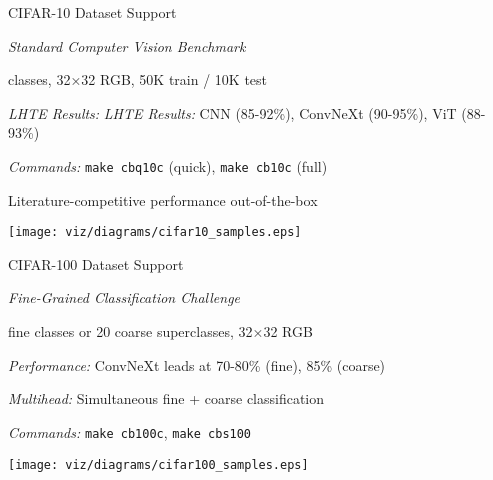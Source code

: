 \begin{slide}[\slideopts,toc={CIFAR-10}]{CIFAR-10 Dataset Support}
  
  \emph{Standard Computer Vision Benchmark}
  
  \begin{itemize}
     classes, 32×32 RGB, 50K train / 10K test
    
    \mpitem \emph{LHTE Results:}
    \mpitem \emph{LHTE Results:} CNN (85-92\%), ConvNeXt (90-95\%), ViT (88-93\%)
    
    \mpitem \emph{Commands:} \texttt{make cbq10c} (quick), \texttt{make cb10c} (full)
    
    \mpitem Literature-competitive performance out-of-the-box
  \end{itemize}
  
  \vspace{0.5em}
  \centerline{\texttt{[image: viz/diagrams/cifar10\_samples.eps]}}
\end{slide}

\begin{slide}[\slideopts,toc={CIFAR-100}]{CIFAR-100 Dataset Support}
  
  \emph{Fine-Grained Classification Challenge}
  
  \begin{itemize}
     fine classes or 20 coarse superclasses, 32×32 RGB
    
    \mpitem \emph{Performance:} ConvNeXt leads at 70-80\% (fine), 85\% (coarse)
    
    \mpitem \emph{Multihead:} Simultaneous fine + coarse classification
    
    \mpitem \emph{Commands:} \texttt{make cb100c}, \texttt{make cbs100}
  \end{itemize}
  
  \vspace{0.5em}
  \centerline{\texttt{[image: viz/diagrams/cifar100\_samples.eps]}}
\end{slide}

